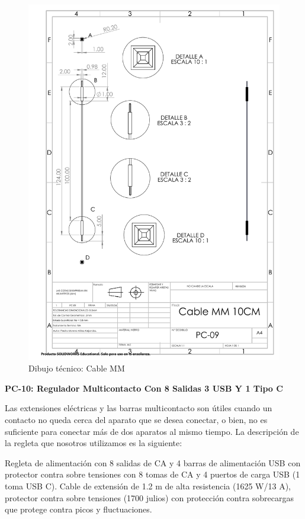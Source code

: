     \begin{figure}[H]
        \centering
        \includegraphics[trim = {7mm 1mm 1mm 1mm},clip,scale=0.4]{22/Img/cableMMDibujo.PDF}
        \caption{Dibujo técnico: Cable MM}
        \label{fig:Cable MM}
    \end{figure}
    
    \textbf{PC-10: Regulador Multicontacto Con 8 Salidas 3 USB Y 1 Tipo C }
    
    Las extensiones eléctricas y las barras multicontacto son útiles cuando un contacto no queda cerca del aparato que se desea conectar, o bien, no es suficiente para conectar más de dos aparatos al mismo tiempo.
    La descripción de la regleta que nosotros utilizamos es la siguiente:
    
    Regleta de alimentación con 8 salidas de CA y 4 barras de alimentación USB con protector contra sobre tensiones con 8 tomas de CA y 4 puertos de carga USB (1 toma USB C). Cable de extensión de 1.2 m de alta resistencia (1625 W/13 A), protector contra sobre tensiones (1700 julios) con protección contra sobrecargas que protege contra picos y fluctuaciones.
    
